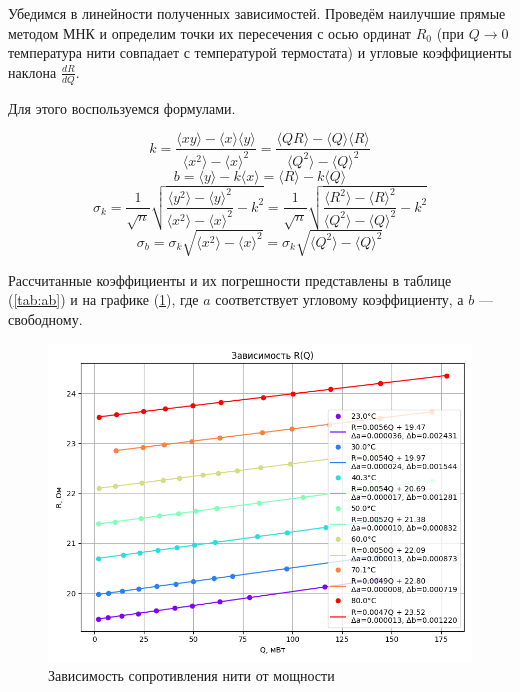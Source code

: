 \documentclass[a4paper,12pt]{article} %
\begin{document}
\begin{enumerate}
    Убедимся в линейности полученных зависимостей. Проведём наилучшие прямые методом МНК и определим точки их пересечения с осью ординат $R_0$ (при $Q \to 0$ температура нити совпадает с температурой термостата) и угловые коэффициенты наклона $\frac{dR}{dQ}$. 

    Для этого воспользуемся формулами.

    \[
      k = \frac{\langle xy \rangle - \langle x \rangle \langle y \rangle}{\langle x^2 \rangle - \langle x \rangle ^2} 
      = \frac{\langle QR \rangle - \langle Q \rangle \langle R \rangle}{\langle Q^2 \rangle - \langle Q \rangle ^2} 
    \]
    \[
      b = \langle y \rangle - k \langle x \rangle 
      = \langle R \rangle - k \langle Q \rangle 
    \]
    \[
      \sigma_k = \frac{1}{\sqrt{n}} \sqrt{\frac{\langle y^2 \rangle - \langle y \rangle ^2}{\langle x^2 \rangle - \langle x \rangle ^2} - k^2} 
      = \frac{1}{\sqrt{n}} \sqrt{\frac{\langle R^2 \rangle - \langle R \rangle ^2}{\langle Q^2 \rangle - \langle Q \rangle ^2} - k^2} 
    \]
    \[
      \sigma_b = \sigma_k \sqrt{\langle x^2 \rangle - \langle x \rangle ^2} 
      = \sigma_k \sqrt{\langle Q^2 \rangle - \langle Q \rangle ^2}
    \]

    Рассчитанные коэффициенты и их погрешности представлены в таблице (\ref{tab:ab}) и на графике (\ref{fig:RQ}), где $a$ соответствует угловому коэффициенту, а $b$ — свободному.

    \begin{figure}[h!]
      \centering
      \includegraphics[scale = 0.75]{images/graph_RQ.png}
      \caption{Зависимость сопротивления нити от мощности}
      \label{fig:RQ}
    \end{figure}


\end{enumerate}
\end{document}
